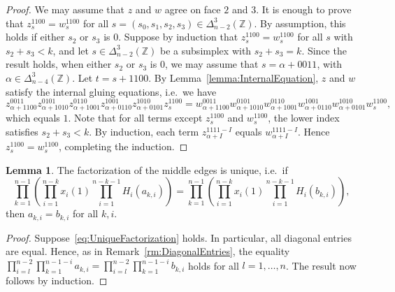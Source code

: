 \documentclass[12pt]{amsart}
\theoremstyle{definition}
\newtheorem{lemma}[theorem]{Lemma}
\numberwithin{equation}{section}
\def\Z{\mathbb{Z}}
\begin{document}
\begin{proof}
We may assume that $z$ and $w$ agree on face $2$ and $3$. It is enough to prove that $z_s^{1100}=w_s^{1100}$ for all $s=(s_0,s_1,s_2,s_3)\in\Delta^3_{n-2}(\Z)$. By assumption, this holds if either $s_2$ or $s_3$ is $0$. Suppose by induction that $z_s^{1100}=w_s^{1100}$ for all $s$ with $s_2+s_3<k$, and let $s\in\Delta^3_{n-2}(\Z)$ be a subsimplex with $s_2+s_3=k$. Since the result holds, when either $s_2$ or $s_3$ is $0$, we may assume that $s=\alpha+0011$, with $\alpha\in\Delta^3_{n-4}(\Z)$. Let $t=s+1100$. By Lemma~\ref{lemma:InternalEquation}, $z$ and $w$ satisfy the internal gluing equations, i.e.~we have
\begin{equation}
z^{0011}_{\alpha+1100}z^{0101}_{\alpha+1010}z^{0110}_{\alpha+1001}z^{1001}_{\alpha+0110}z^{1010}_{\alpha+0101}z^{1100}_s=w^{0011}_{\alpha+1100}w^{0101}_{\alpha+1010}w^{0110}_{\alpha+1001}w^{1001}_{\alpha+0110}w^{1010}_{\alpha+0101}w^{1100}_s,
\end{equation}
which equals $1$. Note that for all terms except $z_s^{1100}$ and $w_s^{1100}$, the lower index satisfies $s_2+s_3<k$. By induction, each term $z^{1111-I}_{\alpha+I}$ equals $w^{1111-I}_{\alpha+I}$. Hence $z^{1100}_s=w_s^{1100}$, completing the induction. 
\end{proof}

\begin{lemma}\label{lemma:UniqueFactorization}
The factorization of the middle edges is unique, i.e.~if
\begin{equation}\label{eq:UniqueFactorization}
\prod_{k=1}^{n-1}\left(\prod^{n-k}_{i=1}x_i(1)\prod_{i=1}^{n-k-1}H_i(a_{k,i})\right)=\prod_{k=1}^{n-1}\left(\prod^{n-k}_{i=1}x_i(1)\prod_{i=1}^{n-k-1}H_i(b_{k,i})\right),
\end{equation}
then $a_{k,i}=b_{k,i}$ for all $k,i$.
\end{lemma}

\begin{proof}
Suppose~\eqref{eq:UniqueFactorization} holds. In particular, all diagonal entries are equal. Hence, as in Remark~\ref{rm:DiagonalEntries}, the equality $\prod_{i=l}^{n-2}\prod_{k=1}^{n-1-i} a_{k,i}=\prod_{i=l}^{n-2}\prod_{k=1}^{n-1-i} b_{k,i}$ holds for all $l=1,\dots,n$. The result now follows by induction.
\end{proof}
\end{document}
